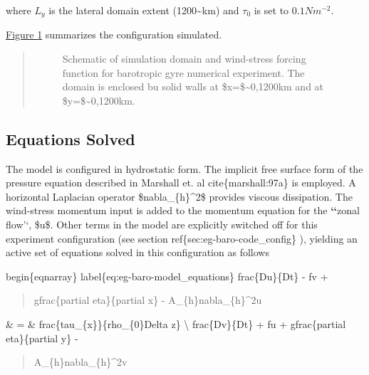 \documentclass[letterpaper,10pt,english]{sphinxmanual}
\begin{document}
where \(L_{y}\) is the lateral domain extent (1200\textasciitilde{}km) and
\(\tau_0\) is set to \(0.1N m^{-2}\).

\hyperref[\detokenize{examples/examples:fig-eg-baro-simulation-config}]{Figure \ref{\detokenize{examples/examples:fig-eg-baro-simulation-config}}} summarizes the configuration simulated.
\begin{quote}
\begin{figure}[htbp]
\centering
\capstart

\noindent{}
\caption{Schematic of simulation domain and wind-stress forcing function for barotropic gyre numerical experiment. The domain is enclosed bu solid walls at \$x=\$\textasciitilde{}0,1200km and at \$y=\$\textasciitilde{}0,1200km.}\label{\detokenize{examples/examples:fig-eg-baro-simulation-config}}\end{figure}
\end{quote}


\subsection{Equations Solved}
\label{\detokenize{examples/examples:equations-solved}}
The model is configured in hydrostatic form. The implicit free surface form of the
pressure equation described in Marshall et. al cite\{marshall:97a\} is
employed.
A horizontal Laplacian operator \$nabla\_\{h\}\textasciicircum{}2\$ provides viscous
dissipation. The wind-stress momentum input is added to the momentum equation
for the {\color{red}\bfseries{}{}`{}`}zonal flow'`, \$u\$. Other terms in the model
are explicitly switched off for this experiment configuration (see section
ref\{sec:eg-baro-code\_config\} ), yielding an active set of equations solved
in this configuration as follows

begin\{eqnarray\}
label\{eq:eg-baro-model\_equations\}
frac\{Du\}\{Dt\} - fv +
\begin{quote}

gfrac\{partial eta\}\{partial x\} -
A\_\{h\}nabla\_\{h\}\textasciicircum{}2u
\end{quote}

\& = \&
frac\{tau\_\{x\}\}\{rho\_\{0\}Delta z\}
\textbackslash{}
frac\{Dv\}\{Dt\} + fu + gfrac\{partial eta\}\{partial y\} -
\begin{quote}

A\_\{h\}nabla\_\{h\}\textasciicircum{}2v
\end{quote}
\end{document}
